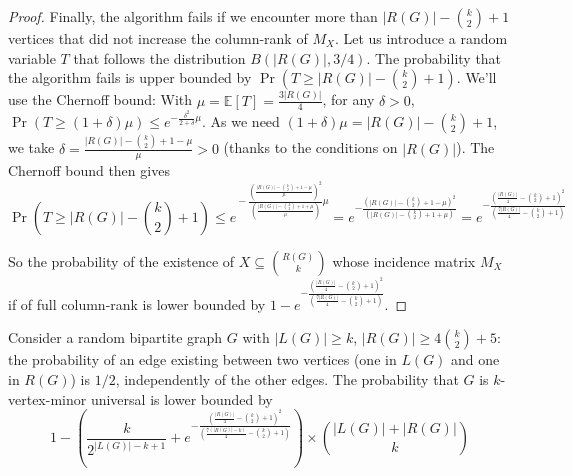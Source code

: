 \documentclass[a4paper,UKenglish,cleveref, autoref, thm-restate]{arxiv}
\newcommand{\se}{\subseteq}
\newcommand{\ls}{\leqslant}
\newcommand{\gs}{\geqslant}
\begin{document}
\begin{proof}
    Finally, the algorithm fails if we encounter more than $|R(G)|-{k \choose 2}+1$ vertices that did not increase the column-rank of $M_X$. Let us introduce a random variable $T$ that follows the distribution $B(|R(G)|,3/4)$. The probability that the algorithm fails is upper bounded by $\Pr(T \gs |R(G)|-{k \choose 2}+1)$. We'll use the Chernoff bound: With $\mu = \mathbb{E}[T] = \frac{3|R(G)|}{4}$, for any $\delta > 0$, $\Pr(T \gs (1+\delta)\mu) \ls e^{-\frac{\delta^2}{2+\delta}\mu}$. As we need $(1+\delta)\mu = |R(G)|-{k \choose 2}+1$, we take $\delta = \frac{|R(G)|-{k \choose 2}+1-\mu}{\mu} >0$ (thanks to the conditions on $|R(G)|$). The Chernoff bound then gives $$ \Pr\left(T \gs |R(G)|\!-\!{k \choose 2}\!+\!1\right) \ls e^{\!-\frac{\left(\frac{|R(G)|-{k \choose 2}+1-\mu}{\mu}\right)^2}{\left(\frac{|R(G)|-{k \choose 2}+1+\mu}{\mu}\right)}\mu} \!\!\!\!\!= e^{-\frac{\left(|R(G)|-{k \choose 2}+1-\mu\right)^2}{\left(|R(G)|-{k \choose 2}+1+\mu\right)}} = e^{-\frac{\left(\frac{|R(G)|}{4}-{k \choose 2}+1\right)^2}{\left(\frac{7|R(G)|}{4}-{k \choose 2}+1\right)}} $$

    So the probability of the existence of $X \se {R(G) \choose k}$ whose incidence matrix $M_X$ if of full column-rank is lower bounded by $ 1 -e^{-\frac{\left(\frac{|R(G)|}{4}-{k \choose 2}+1\right)^2}{\left(\frac{7|R(G)|}{4}-{k \choose 2}+1\right)}} $.

\end{proof}

\begin{lemma}
    \label{prop:proba_vmu}
    Consider a random bipartite graph $G$ with $|L(G)|\gs k$, $|R(G)|\gs4{k \choose 2}+5$: the probability of an edge existing between two vertices (one in $L(G)$ and one in $R(G)$) is $1/2$, independently of the other edges. The probability that $G$ is $k$-vertex-minor universal is lower bounded by $$  1 - \left( \frac{k}{2^{|L(G)|-k+1}} + e^{-\frac{\left(\frac{|R(G)|}{4}-{k \choose 2}+1\right)^2}{\left(\frac{7(|R(G)|-k)}{4}-{k \choose 2}+1\right)}}\right)\times {|L(G)|+|R(G)| \choose k} $$
\end{lemma}
\end{document}
